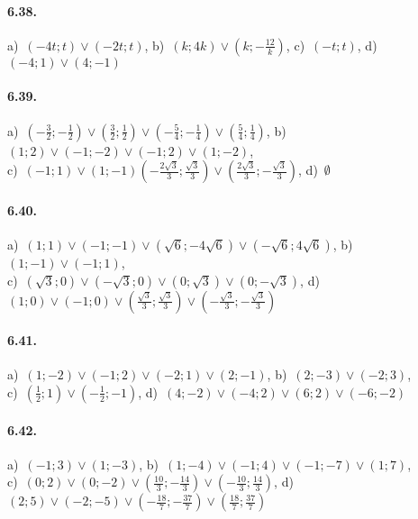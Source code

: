 \paragraph{6.38.} 
a)~\((-4t;t)\vee(-2t;t)\),\quad 
b)~\((k;4k)\vee(k;-\frac{1 2}k)\),\quad 
c)~\((-t;t)\),\quad 
d)~\((-4;1)\vee(4;-1)\)

\paragraph{6.39.} 
a)~\(\left(-\frac 3 2;-\frac 1 2\right)\vee\left(\frac 3 2;\frac 1 
2\right)\vee\left(-\frac 5 4;-\frac 1 4\right)\vee\left(\frac 5 4;\frac 1 
4\right)\),\quad 
b)~\((1;2)\vee(-1;-2)\vee (-1;2)\vee (1;-2)\),\protect\\
\quad 
c)~\((-1;1)\vee (1;-1)\left(-\frac{2\sqrt 3} 3;\frac{\sqrt 3} 
3\right)\vee\left(\frac{2\sqrt 3} 3;-\frac{\sqrt 3} 3\right)\),\quad 
d)~\(\emptyset\)

\paragraph{6.40.} 
a)~\((1;1)\vee(-1;-1)\vee\left(\sqrt 6;-4\sqrt 6\right)\vee
\left(-\sqrt 6;4\sqrt 6\right)\),\quad 
b)~\((1;-1)\vee(-1;1)\),\protect\\
\quad 
c)~\((\sqrt 3;0)\vee (-\sqrt 3;0)\vee (0;\sqrt 3)\vee (0;-\sqrt 3)\),\quad 
d)~\((1;0)\vee (-1;0)\vee\left(\frac{\sqrt 3} 3;\frac{\sqrt 3} 
3\right)\vee\left(-\frac{\sqrt 3} 3;-\frac{\sqrt 3} 3\right)\)

\paragraph{6.41.} 
a)~\((1;-2)\vee(-1;2)\vee (-2;1)\vee (2;-1)\),\quad 
b)~\((2;-3)\vee(-2;3)\),\protect\\
\quad 
c)~\(\left(\frac 1 2;1\right)\vee \left(-\frac 1 2;-1\right)\),\quad 
d)~\((4;-2)\vee(-4;2)\vee (6;2)\vee (-6;-2)\)

\paragraph{6.42.} 
a)~\((-1;3)\vee(1;-3)\),\quad 
b)~\((1;-4)\vee(-1;4)\vee (-1;-7)\vee (1;7)\),\protect\\
\quad 
c)~\((0;2)\vee (0;-2)\vee \left(\frac{10} 3;-\frac{14} 3\right)\vee 
\left(-\frac{10} 3;\frac{14} 3\right)\),\quad 
d)~\((2;5)\vee (-2;-5)\vee \left(-\frac{18} 7;-\frac{37} 7\right)\vee 
\left(\frac{18} 7;\frac{37} 7\right)\)

